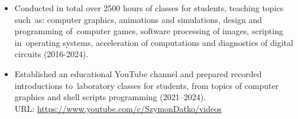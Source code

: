 \begin{itemize}
    \item Conducted in total over 2500 hours of classes for students, teaching topics such~as: computer graphics, animations and simulations, design and programming of~computer games, software processing of images, scripting in~operating systems, acceleration of computations and diagnostics of digital circuits (2016-2024).

    \item Established an educational YouTube channel and prepared recorded introductions to~laboratory classes for students, from topics of computer graphics and shell scripts programming (2021–2024).\\
        URL: \url{https://www.youtube.com/c/SzymonDatko/videos}
\end{itemize}
